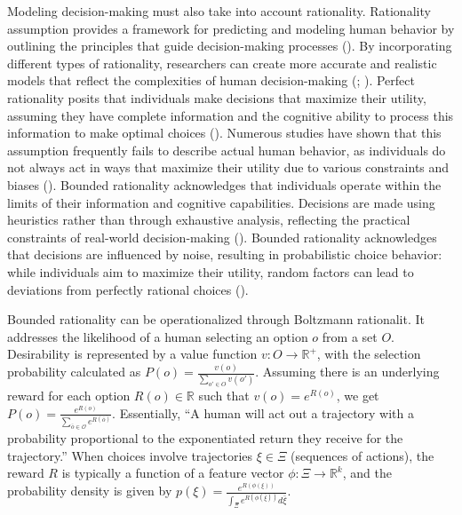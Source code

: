 \documentclass[
  letterpaper,
  numbers=noenddot,
  DIV=11]{scrreprt}
\theoremstyle{definition}
\theoremstyle{plain}
\theoremstyle{plain}
\theoremstyle{remark}
\begin{document}
Modeling decision-making must also take into account rationality.
Rationality assumption provides a framework for predicting and modeling
human behavior by outlining the principles that guide decision-making
processes (). By
incorporating different types of rationality, researchers can create
more accurate and realistic models that reflect the complexities of
human decision-making (; ). Perfect
rationality posits that individuals make decisions that maximize their
utility, assuming they have complete information and the cognitive
ability to process this information to make optimal choices
(). Numerous studies
have shown that this assumption frequently fails to describe actual
human behavior, as individuals do not always act in ways that maximize
their utility due to various constraints and biases
(). Bounded
rationality acknowledges that individuals operate within the limits of
their information and cognitive capabilities. Decisions are made using
heuristics rather than through exhaustive analysis, reflecting the
practical constraints of real-world decision-making
(). Bounded rationality
acknowledges that decisions are influenced by noise, resulting in
probabilistic choice behavior: while individuals aim to maximize their
utility, random factors can lead to deviations from perfectly rational
choices ().

Bounded rationality can be operationalized through Boltzmann rationalit.
It addresses the likelihood of a human selecting an option \(o\) from a
set \(O\). Desirability is represented by a value function
\(v : O \rightarrow \mathbb{R}^+\), with the selection probability
calculated as \(P(o) = \frac{v(o)}{\sum_{o' \in O} v(o')}\). Assuming
there is an underlying reward for each option \(R(o) \in \mathbb{R}\)
such that \(v(o) = e^{R(o)}\), we get
\(P(o) = \frac{e^{R(o)}}{\sum_{\bar{o} \in \mathcal{O}} e^{R(\bar{o})}}\).
Essentially, ``A human will act out a trajectory with a probability
proportional to the exponentiated return they receive for the
trajectory.'' When choices involve trajectories \(\xi \in \Xi\)
(sequences of actions), the reward \(R\) is typically a function of a
feature vector \(\phi : \Xi \rightarrow \mathbb{R}^k\), and the
probability density is given by
\(p(\xi) = \frac{e^{R(\phi(\xi))}}{\int_{\Xi} e^{R(\phi(\bar{\xi}))} d\bar{\xi}}\).
\end{document}
